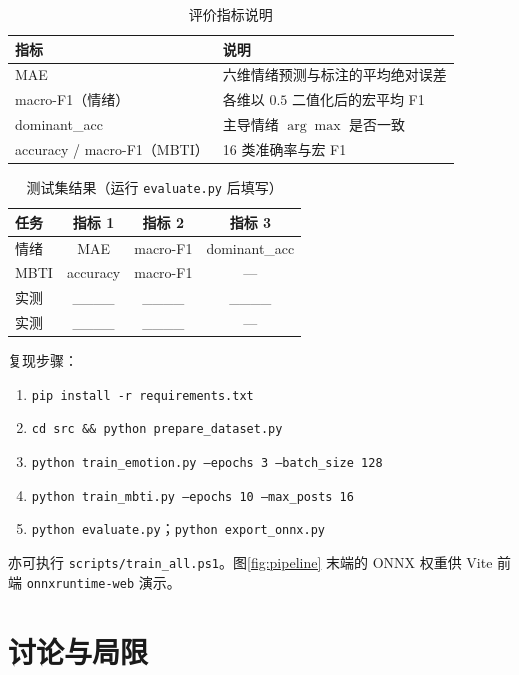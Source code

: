 \begin{table}[htbp]
    \centering
    \caption{评价指标说明}
    \label{tab:metrics}
    \begin{tabular}{lp{7.2cm}}
        \toprule
        指标 & 说明 \\
        \midrule
        MAE & 六维情绪预测与标注的平均绝对误差 \\
        macro-F1（情绪） & 各维以 $0.5$ 二值化后的宏平均 F1 \\
        dominant\_acc & 主导情绪 $\arg\max$ 是否一致 \\
        accuracy / macro-F1（MBTI） & 16 类准确率与宏 F1 \\
        \bottomrule
    \end{tabular}
\end{table}

\begin{table}[htbp]
    \centering
    \caption{测试集结果（运行 \texttt{evaluate.py} 后填写）}
    \label{tab:results}
    \begin{tabular}{lccc}
        \toprule
        任务 & 指标 1 & 指标 2 & 指标 3 \\
        \midrule
        情绪 & MAE & macro-F1 & dominant\_acc \\
        MBTI & accuracy & macro-F1 & — \\
        \midrule
        实测 & \_\_\_\_ & \_\_\_\_ & \_\_\_\_ \\
        实测 & \_\_\_\_ & \_\_\_\_ & — \\
        \bottomrule
    \end{tabular}
\end{table}

复现步骤：
\begin{enumerate}
    \item \texttt{pip install -r requirements.txt}
    \item \texttt{cd src \&\& python prepare\_dataset.py}
    \item \texttt{python train\_emotion.py --epochs 3 --batch\_size 128}
    \item \texttt{python train\_mbti.py --epochs 10 --max\_posts 16}
    \item \texttt{python evaluate.py}；\texttt{python export\_onnx.py}
\end{enumerate}
亦可执行 \texttt{scripts/train\_all.ps1}。图\ref{fig:pipeline} 末端的 ONNX 权重供 Vite 前端 \texttt{onnxruntime-web} 演示。

\section{讨论与局限}

